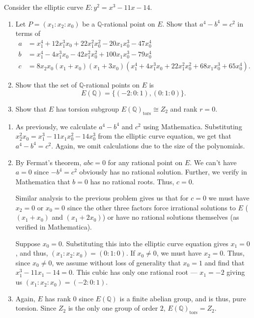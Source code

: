 \documentclass[12 pt, letterpaper]{hmcpset}
\begin{document}
\pagebreak

\begin{problem}[Problem 3.]
	Consider the elliptic curve $E : y^{2} = x^{3} - 11 x - 14$.
	\begin{enumerate}
		\item Let $P = (x_{1} : x_{2} : x_{0})$ be a $\mathbb{Q}$-rational point on $E$. Show that $a^{4} - b^{4} = c^{2}$ in terms of
			\[
				\begin{split}
					a & = x_{1}^{4} + 12 x_{1}^{3} x_{0} + 22 x_{1}^{2} x_{0}^{2} - 20 x_{1} x_{0}^{3} - 47 x_{0}^{4} \\
					b & = x_{1}^{4} - 4 x_{1}^{3} x_{0} - 42 x_{1}^{2} x_{0}^{2} + 100 x_{1} x_{0}^{3} - 79 x_{0}^{4} \\
					c & = 8 x_{2} x_{0} (x_{1} + x_{0})(x_{1} + 3 x_{0})(x_{1}^{4} + 4 x_{1}^{3} x_{0} + 22 x_{1}^{2} x_{0}^{2} + 68 x_{1} x_{0}^{3} + 65 x_{0}^{4}).
				\end{split}
			\]
		\item Show that the set of $\mathbb{Q}$-rational points on $E$ is
			\[
				E(\mathbb{Q}) = \{ (-2 : 0 : 1), (0 : 1 : 0) \}.
			\]
		\item Show that $E$ has torsion subgroup $E(\mathbb{Q})_{\text{tors}} \cong Z_{2}$ and rank $r = 0$.
	\end{enumerate}
\end{problem}

\begin{solution}
	\begin{enumerate}
		\item As previously, we calculate $a^{4} - b^{4}$ and $c^{2}$ using Mathematica. Substituting $x_{2}^{2} x_{0} = x_{1}^{3} - 11 x_{1} x_{0}^{2} - 14 x_{0}^{3}$ from the elliptic curve equation, we get that $a^{4} - b^{4} = c^{2}$. Again, we omit calculations due to the size of the polynomials.
		\item By Fermat's theorem, $abc = 0$ for any rational point on $E$. We can't have $a = 0$ since $- b^{4} = c^{2}$ obviously has no rational solution. Further, we verify in Mathematica that $b = 0$ has no rational roots. Thus, $c = 0$.

			Similar analysis to the previous problem gives us that for $c = 0$ we must have $x_{2} = 0$ or $x_{0} = 0$ since the other three factors force irrational solutions to $E$ ($(x_{1} + x_{0})$ and $(x_{1} + 2 x_{0})$) or have no rational solutions themselves (as verified in Mathematica). 

			Suppose $x_{0} = 0$. Substituting this into the elliptic curve equation gives $x_{1} = 0$, and thus, $(x_{1} : x_{2} : x_{0}) = (0 : 1 : 0)$. If $x_{0} \neq 0$, we must have $x_{2} = 0$. Thus, since $x_{0} \neq 0$, we assume without loss of generality that $x_{0} = 1$ and find that $x_{1}^{3} - 11 x_{1} - 14 = 0$. This cubic has only one rational root --- $x_{1} = - 2$ giving us $(x_{1} : x_{2} : x_{0}) = (-2 : 0 : 1)$.
		\item Again, $E$ has rank $0$ since $E(\mathbb{Q})$ is a finite abelian group, and is thus, pure torsion. Since $Z_{2}$ is the only one group of order $2$, $E(\mathbb{Q})_{\text{tors}} = Z_{2}$.
	\end{enumerate}
\end{solution}
\end{document}

